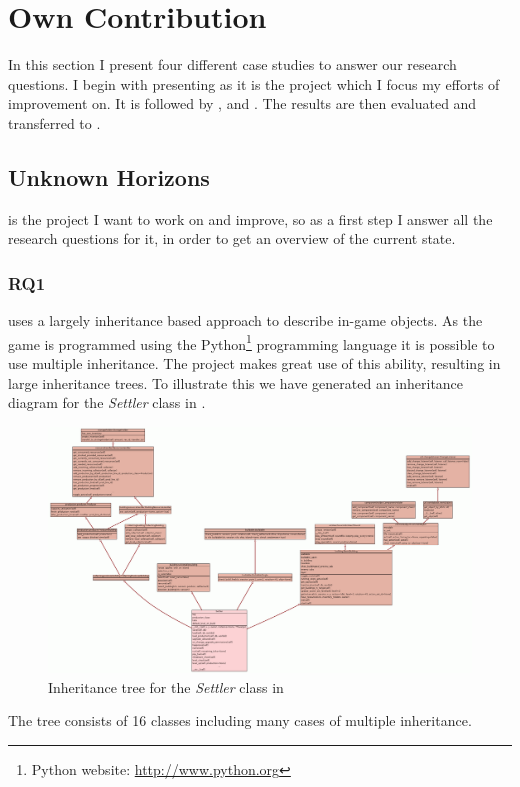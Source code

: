 \section{Own Contribution}
In this section I present four different case studies to answer our research questions. I begin with presenting
\UH{} as it is the project which I focus my efforts of improvement on. It is followed by \BOW{}, \GLEST{} and \AD{}.
The results are then evaluated and transferred to \UH{}.

\subsection{Unknown Horizons}
\UH{} is the project I want to work on and improve, so as a first step I answer all the research questions for it, in
order to get an overview of the current state.

\subsubsection{RQ1}
\UH{} uses a largely inheritance based approach to describe in-game objects. As the game is programmed using
the Python\footnote{Python website: \url{http://www.python.org}} programming language it is possible to use multiple
inheritance. The project makes great use of this ability, resulting in large inheritance trees. To illustrate this we
have generated an inheritance diagram for the \textit{Settler} class in . 
\begin{figure}[!htb]
\includegraphics[angle=90,scale=0.25]{pics/settler_uml}
\caption{Inheritance tree for the \textit{Settler} class in \UH{}}
\label{fig:settleruml}
\end{figure}
The tree consists of 16 classes including many cases of multiple inheritance. 

